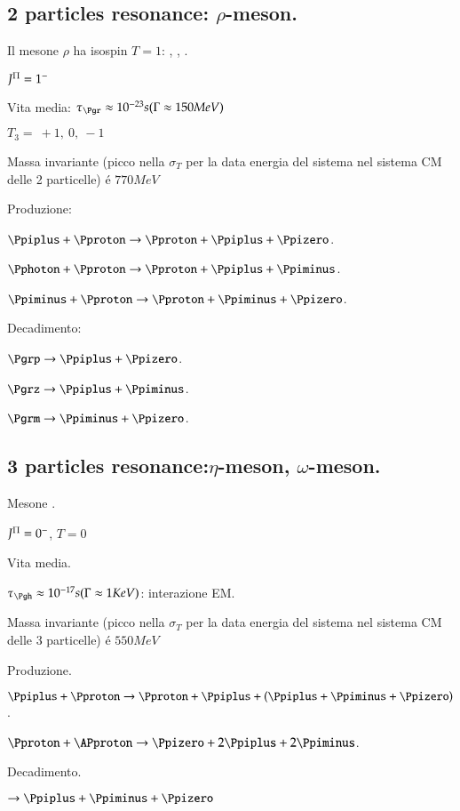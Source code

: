 \documentclass[main.tex]{subfiles}
\begin{document}
\subsection{2 particles resonance: $\rho$-meson.}

Il mesone $\rho$ ha isospin $T=1$: \Pgrp, \Pgrz, \Pgrm.

\begin{itemize*}
\item $J^{\Pi}=1^-$
\item Vita media: $\tau_{\Pgr}\approx10^{-23}s (\Gamma\approx150 MeV)$
\item $T_3=\ +1,\ 0,\ -1$
\item Massa invariante (picco nella $\sigma_T$ per la data energia del sistema \Pgp\Pgp nel sistema CM delle 2 particelle) \'e $770 MeV$
\item Produzione:

$\Ppiplus+\Pproton\to\Pproton+\Ppiplus+\Ppizero$.

$\Pphoton+\Pproton\to\Pproton+\Ppiplus+\Ppiminus$.

$\Ppiminus+\Pproton\to\Pproton+\Ppiminus+\Ppizero$.

\item Decadimento:

$\Pgrp\rightarrow\Ppiplus+\Ppizero$.

$\Pgrz\rightarrow\Ppiplus+\Ppiminus$.

$\Pgrm\rightarrow\Ppiminus+\Ppizero$.

\end{itemize*}

\subsection{3 particles resonance:$\eta$-meson, $\omega$-meson.} 


Mesone \Pgh.

\begin{itemize*}
\item $J^{\Pi}=0^-$, $T=0$
\item Vita media.

$\tau_{\Pgh}\approx10^{-17}s (\Gamma\approx 1 KeV)$: interazione EM.

\item Massa invariante (picco nella $\sigma_T$ per la data energia del sistema \Pgp\Pgp\Pgp nel sistema CM delle 3 particelle) \'e $550 MeV$

\item Produzione.

$\Ppiplus+\Pproton\to\Pproton+\Ppiplus+(\Ppiplus+\Ppiminus+\Ppizero)$.

$\Pproton+\APproton\to\Ppizero+2\Ppiplus+2\Ppiminus$.
\item Decadimento.

$\to\Ppiplus+\Ppiminus+\Ppizero$

\end{itemize*}
\end{document}
